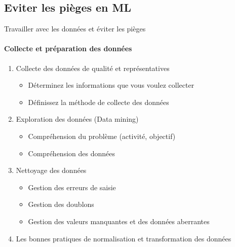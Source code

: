 \documentclass{beamer}
\begin{document}
	\subsection{Eviter les pièges en ML}
\begin{frame}{Travailler avec les données et éviter les pièges}
	\framesubtitle{Collecte et préparation des données}
	\begin{enumerate}
		\item Collecte des données de qualité et représentatives
			\begin{itemize}
				\item Déterminez les informations que vous voulez collecter
				\item Définissez la méthode de collecte des données
			\end{itemize}
		\item Exploration des données (Data mining)
			\begin{itemize}
				\item Compréhension du problème (activité, objectif)
				\item Compréhension des données
			\end{itemize}
		\item Nettoyage des données 
			\begin{itemize}
				\item Gestion des erreurs de saisie
				\item  Gestion des doublons
				\item  Gestion des valeurs manquantes et des données aberrantes
			\end{itemize}
		\item Les bonnes pratiques de normalisation et transformation des données
	\end{enumerate}
\end{frame}
	
	
\end{document}
